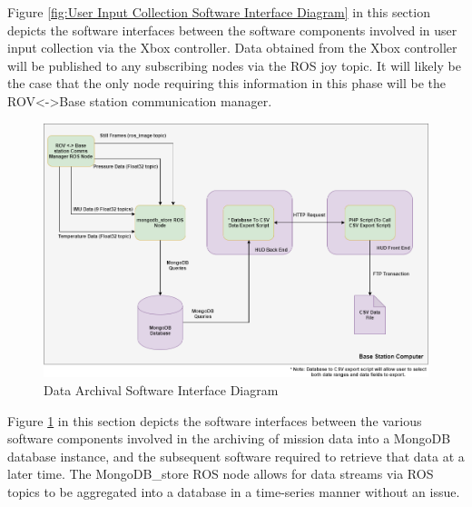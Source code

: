 \documentclass{scrreprt}
\begin{document}
Figure \ref{fig:User Input Collection Software Interface Diagram} in this section depicts the software interfaces between the software components involved in user input collection via the Xbox controller. Data obtained from the Xbox controller will be published to any subscribing nodes via the ROS joy topic. It will likely be the case that the only node requiring this information in this phase will be the ROV<->Base station communication manager. 

\begin{figure}[!ht]
    \centering
    \includegraphics[scale=0.45]{DataArchival.png}
    \caption{Data Archival Software Interface Diagram}
    \label{fig:Data Archival Software Interface Diagram}
\end{figure}
\FloatBarrier

Figure \ref{fig:Data Archival Software Interface Diagram} in this section depicts the software interfaces between the various software components involved in the archiving of mission data into a MongoDB database instance, and the subsequent software required to retrieve that data at a later time. The MongoDB_store ROS node allows for data streams via ROS topics to be aggregated into a database in a time-series manner without an issue.
\end{document}
